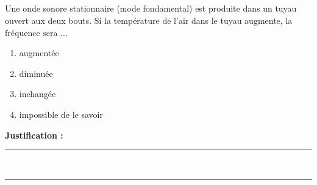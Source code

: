 \subsection{} 
Une onde sonore stationnaire (mode fondamental) est produite dans un tuyau ouvert aux deux bouts. Si la température de l'air dans le tuyau augmente, la fréquence sera ...

\begin{enumerate}[label=\Alph*)]
    \item augmentée
    \item diminuée
    \item inchangée
    \item impossible de le savoir
\end{enumerate}

\noindent\textbf{Justification :} \hrulefill \\[2.5ex]
\rule{\linewidth}{0.4pt} \\[2.5ex]
\rule{\linewidth}{0.4pt}
\vfill